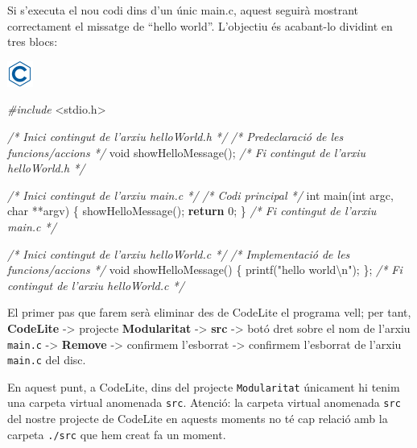 \documentclass[]{book}
\newenvironment{Shaded}{\begin{snugshade}}{\end{snugshade}}
\newcommand{\CommentTok}[1]{\textcolor[rgb]{0.56,0.35,0.01}{\textit{#1}}}
\newcommand{\ControlFlowTok}[1]{\textcolor[rgb]{0.13,0.29,0.53}{\textbf{#1}}}
\newcommand{\DataTypeTok}[1]{\textcolor[rgb]{0.13,0.29,0.53}{#1}}
\newcommand{\DecValTok}[1]{\textcolor[rgb]{0.00,0.00,0.81}{#1}}
\newcommand{\ImportTok}[1]{#1}
\newcommand{\NormalTok}[1]{#1}
\newcommand{\PreprocessorTok}[1]{\textcolor[rgb]{0.56,0.35,0.01}{\textit{#1}}}
\newcommand{\SpecialCharTok}[1]{\textcolor[rgb]{0.00,0.00,0.00}{#1}}
\newcommand{\StringTok}[1]{\textcolor[rgb]{0.31,0.60,0.02}{#1}}
\begin{document}
Si s'executa el nou codi dins d'un únic main.c, aquest seguirà mostrant correctament el missatge de ``hello world''. L'objectiu és acabant-lo dividint en tres blocs:

\includegraphics{./img/c.png}

\begin{Shaded}
\begin{Highlighting}[]
\PreprocessorTok{\#include }\ImportTok{\textless{}stdio.h\textgreater{}}

\CommentTok{/* Inici contingut de l’arxiu helloWorld.h */}
\CommentTok{/* Predeclaració de les funcions/accions */}
\DataTypeTok{void}\NormalTok{ showHelloMessage();}
\CommentTok{/* Fi contingut de l’arxiu helloWorld.h */}

\CommentTok{/* Inici contingut de l’arxiu main.c */}
\CommentTok{/* Codi principal */}
\DataTypeTok{int}\NormalTok{ main(}\DataTypeTok{int}\NormalTok{ argc, }\DataTypeTok{char}\NormalTok{ **argv) \{}
\NormalTok{    showHelloMessage();}
    \ControlFlowTok{return} \DecValTok{0}\NormalTok{;}
\NormalTok{\}}
\CommentTok{/* Fi contingut de l’arxiu main.c */}

\CommentTok{/* Inici contingut de l’arxiu helloWorld.c */}
\CommentTok{/* Implementació de les funcions/accions */}
\DataTypeTok{void}\NormalTok{ showHelloMessage() \{}
\NormalTok{    printf(}\StringTok{"hello world}\SpecialCharTok{\textbackslash{}n}\StringTok{"}\NormalTok{);}
\NormalTok{\};}
\CommentTok{/* Fi contingut de l’arxiu helloWorld.c */}
\end{Highlighting}
\end{Shaded}

El primer pas que farem serà eliminar des de CodeLite el programa vell; per tant, \textbf{CodeLite} -\textgreater{} projecte \textbf{Modularitat} -\textgreater{} \textbf{src} -\textgreater{} botó dret sobre el nom de l'arxiu \texttt{main.c} -\textgreater{} \textbf{Remove} -\textgreater{} confirmem l'esborrat -\textgreater{} confirmem l'esborrat de l'arxiu \texttt{main.c} del disc.

En aquest punt, a CodeLite, dins del projecte \texttt{Modularitat} únicament hi tenim una carpeta virtual anomenada \texttt{src}. Atenció: la carpeta virtual anomenada \texttt{src} del nostre projecte de CodeLite en aquests moments no té cap relació amb la carpeta \texttt{./src} que hem creat fa un moment.
\end{document}
